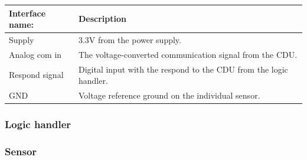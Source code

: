 \begin{table}[H]
	\centering
	\begin{tabular}{|p{3cm} | p{8cm}| }
		\hline
		Interface name: & Description \\ \hline
		Supply			& 3.3V from the power supply. \\ \hline
		Analog com in	& The voltage-converted communication signal from the CDU.\\ \hline
		Respond signal  & Digital input with the respond to the CDU from the logic handler. \\ \hline
		GND				& Voltage reference ground on the individual sensor.\\\hline 
	\end{tabular}
\end{table}


\subsubsection{Logic handler}

\subsubsection{Sensor}
